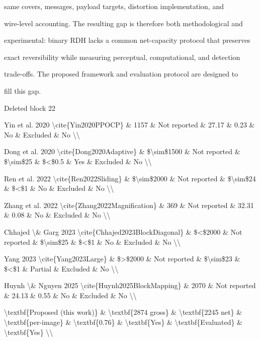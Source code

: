 \documentclass[a4paper,fleqn]{cas-dc}
\newenvironment{RevisionDeletion}{%
  \par\begingroup\color{revisionred}\footnotesize\ttfamily
  \setlength{\parindent}{0pt}\setlength{\parskip}{1pt}\obeyspaces
}{\par\endgroup}
\begin{document}
\begin{RevisionDeletion}
same covers, messages, payload targets, distortion implementation, and\par
wire-level accounting. The resulting gap is therefore both methodological and\par
experimental: binary RDH lacks a common net-capacity protocol that preserves\par
exact reversibility while measuring perceptual, computational, and detection\par
trade-offs. The proposed framework and evaluation protocol are designed to\par
fill this gap.\par
\end{RevisionDeletion}

\begin{RevisionDeletion}
Deleted block 22\par
Yin et al. 2020 \textbackslash{}cite\{Yin2020PPOCP\} \& 1157 \& Not reported \& 27.17 \& 0.23 \& No \& Excluded \& No \textbackslash{}\textbackslash{}\par
Dong et al. 2020 \textbackslash{}cite\{Dong2020Adaptive\} \& \$\textbackslash{}sim\$1500 \& Not reported \& \$\textbackslash{}sim\$25 \& \$<\$0.5 \& Yes \& Excluded \& No \textbackslash{}\textbackslash{}\par
Ren et al. 2022 \textbackslash{}cite\{Ren2022Sliding\} \& \$\textbackslash{}sim\$2000 \& Not reported \& \$\textbackslash{}sim\$24 \& \$<\$1 \& No \& Excluded \& No \textbackslash{}\textbackslash{}\par
Zhang et al. 2022 \textbackslash{}cite\{Zhang2022Magnification\} \& 369 \& Not reported \& 32.31 \& 0.08 \& No \& Excluded \& No \textbackslash{}\textbackslash{}\par
Chhajed \textbackslash{}\& Garg 2023 \textbackslash{}cite\{Chhajed2023BlockDiagonal\} \& \$<\$2000 \& Not reported \& \$\textbackslash{}sim\$25 \& \$<\$1 \& No \& Excluded \& No \textbackslash{}\textbackslash{}\par
Yang 2023 \textbackslash{}cite\{Yang2023Large\} \& \$>\$2000 \& Not reported \& \$\textbackslash{}sim\$23 \& \$<\$1 \& Partial \& Excluded \& No \textbackslash{}\textbackslash{}\par
Huynh \textbackslash{}\& Nguyen 2025 \textbackslash{}cite\{Huynh2025BlockMapping\} \& 2070 \& Not reported \& 24.13 \& 0.55 \& No \& Excluded \& No \textbackslash{}\textbackslash{}\par
\textbackslash{}textbf\{Proposed (this work)\} \& \textbackslash{}textbf\{2874 gross\} \& \textbackslash{}textbf\{2245 net\} \& \textbackslash{}textbf\{per-image\} \& \textbackslash{}textbf\{0.76\} \& \textbackslash{}textbf\{Yes\} \& \textbackslash{}textbf\{Evaluated\} \& \textbackslash{}textbf\{Yes\} \textbackslash{}\textbackslash{}\par
\end{RevisionDeletion}
\end{document}
